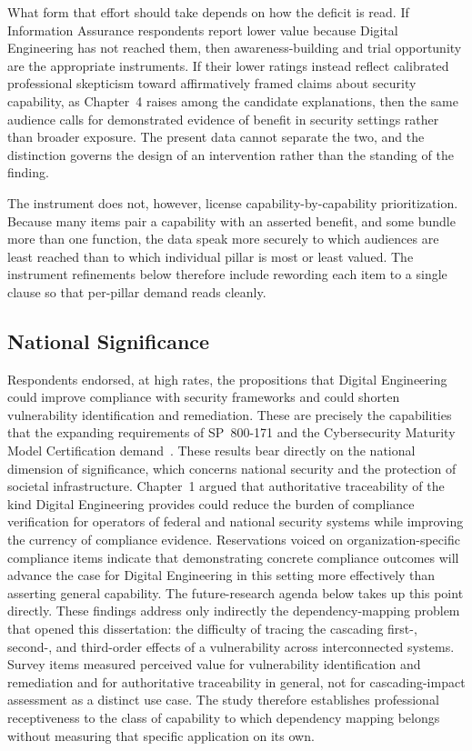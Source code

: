 What form that effort should take depends on how the deficit is read. If Information Assurance respondents report lower value because Digital Engineering has not reached them, then awareness-building and trial opportunity are the appropriate instruments. If their lower ratings instead reflect calibrated professional skepticism toward affirmatively framed claims about security capability, as Chapter~4 raises among the candidate explanations, then the same audience calls for demonstrated evidence of benefit in security settings rather than broader exposure. The present data cannot separate the two, and the distinction governs the design of an intervention rather than the standing of the finding.

The instrument does not, however, license capability-by-capability prioritization. Because many items pair a capability with an asserted benefit, and some bundle more than one function, the data speak more securely to which audiences are least reached than to which individual pillar is most or least valued. The instrument refinements below therefore include rewording each item to a single clause so that per-pillar demand reads cleanly.

\subsection{National Significance}

Respondents endorsed, at high rates, the propositions that Digital Engineering could improve compliance with security frameworks and could shorten vulnerability identification and remediation. These are precisely the capabilities that the expanding requirements of SP~800-171 and the Cybersecurity Maturity Model Certification demand~\parencite{NIST_SP_800_171_R3_2024, DoD_CMMC_2024}. These results bear directly on the national dimension of significance, which concerns national security and the protection of societal infrastructure. Chapter~1 argued that authoritative traceability of the kind Digital Engineering provides could reduce the burden of compliance verification for operators of federal and national security systems while improving the currency of compliance evidence. Reservations voiced on organization-specific compliance items indicate that demonstrating concrete compliance outcomes will advance the case for Digital Engineering in this setting more effectively than asserting general capability. The future-research agenda below takes up this point directly. These findings address only indirectly the dependency-mapping problem that opened this dissertation: the difficulty of tracing the cascading first-, second-, and third-order effects of a vulnerability across interconnected systems. Survey items measured perceived value for vulnerability identification and remediation and for authoritative traceability in general, not for cascading-impact assessment as a distinct use case. The study therefore establishes professional receptiveness to the class of capability to which dependency mapping belongs without measuring that specific application on its own.

